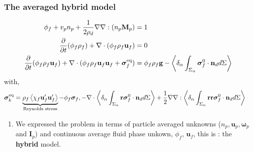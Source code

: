 \documentclass{sintefbeamer}
\begin{document}
\begin{frame}
  \frametitle{The averaged hybrid model }
\begin{align*}
    \phi_f +  v_p n_p 
   + \frac{1}{2\rho_d}\mathbf{\nabla}\mathbf{\nabla} : (n_p\textbf{M}_p) &= 1\\
  \frac{\partial}{\partial t} (\phi_f \rho_f)  
  + \mathbf{\nabla}\cdot (\phi_f \rho_f\textbf{u}_f)
  &= 
  0\\
  \frac{\partial}{\partial t} (\phi_f \rho_f\textbf{u}_f)  
  + \mathbf{\nabla}\cdot (
      \phi_f \rho_f\textbf{u}_f\textbf{u}_f
      + \bm{\sigma}_f^\text{eq}
  )
  &= 
  \phi_f  \rho_f \textbf{g}
  -    \left<\delta_\alpha \int_{\Sigma_\alpha} \bm{\sigma}_f^0 \cdot \textbf{n}_d d\Sigma\right>
\end{align*}
with, 
\begin{align*}
  &\bm{\sigma}_k^\text{eq}
  = 
  \underbrace{\rho_f\avg{\chi_f \textbf{u}_f'\textbf{u}_f'}}_\text{Reynolds stress}
  - \phi_f \bm{\sigma}_f,%
  - \div \pSavg{\textbf{r}\bm{\sigma}_f^0 \cdot \textbf{n}_d}
  +\frac{1}{2} \grad\grad : \pSavg{\textbf{rr}\bm{\sigma}_f^0 \cdot \textbf{n}_d}
\end{align*}
\begin{enumerate}
  \item We expressed the problem in terms of particle averaged unknowns ($n_p, \textbf{u}_p, \bm\omega_p$ and $\textbf{I}_p$) and continuous average fluid phase unkown, $\phi_f$, $\textbf{u}_f$, this is : the \textbf{hybrid} model. 
\end{enumerate}

\end{frame}
\end{document}
